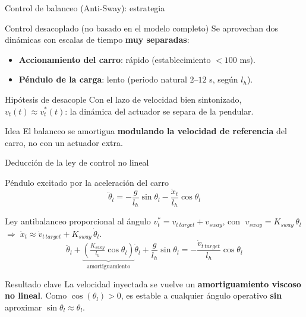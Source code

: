 \begin{frame}{Control de balanceo (Anti-Sway): estrategia}
  \begin{block}{Control desacoplado (no basado en el modelo completo)}
    Se aprovechan dos dinámicas con escalas de tiempo \textbf{muy separadas}:
    \begin{itemize}
      \item \textbf{Accionamiento del carro}: rápido (establecimiento $< 100$ ms).
      \item \textbf{Péndulo de la carga}: lento (periodo natural $2$--$12$ s, según $l_h$).
    \end{itemize}
  \end{block}

  \begin{block}{Hipótesis de desacople}
    Con el lazo de velocidad bien sintonizado, $v_t(t) \approx v_t^*(t)$: la dinámica del
    actuador se separa de la pendular.
  \end{block}

  \begin{alertblock}{Idea}
    El balanceo se amortigua \textbf{modulando la velocidad de referencia} del carro, no con un
    actuador extra.
  \end{alertblock}
\end{frame}

\begin{frame}{Deducción de la ley de control no lineal}
  \begin{block}{Péndulo excitado por la aceleración del carro}
    \[
    \ddot\theta_l = -\frac{g}{l_h}\sin\theta_l - \frac{\ddot x_t}{l_h}\cos\theta_l
    \]
  \end{block}

  \vspace{-0.15cm}
  \begin{block}{Ley antibalanceo proporcional al ángulo}
    $v_t^* = v_{t\,target} + v_{sway}$, \quad con $\;v_{sway} = K_{sway}\,\theta_l$ \quad
    $\Rightarrow\; \ddot x_t \approx \dot v_{t\,target} + K_{sway}\,\dot\theta_l$.
    \[
    \ddot\theta_l + \underbrace{\left(\tfrac{K_{sway}}{l_h}\cos\theta_l\right)}_{\text{amortiguamiento}}\dot\theta_l
    + \frac{g}{l_h}\sin\theta_l = -\frac{\dot v_{t\,target}}{l_h}\cos\theta_l
    \]
  \end{block}

  \begin{alertblock}{Resultado clave}
    La velocidad inyectada se vuelve un \textbf{amortiguamiento viscoso no lineal}. Como
    $\cos(\theta_l) > 0$, es estable a cualquier ángulo operativo \textbf{sin} aproximar
    $\sin\theta_l\approx\theta_l$.
  \end{alertblock}
\end{frame}


